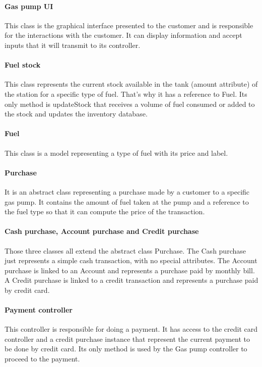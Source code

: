 \paragraph{Gas pump UI}
This class is the graphical interface presented to the customer and is responsible for the interactions with the customer. It can display information and accept inputs that it will transmit to its controller.

\paragraph{Fuel stock}
This class represents the current stock available in the tank (amount attribute) of the station for a specific type of fuel. That's why it has a reference to Fuel.
Its only method is updateStock that receives a volume of fuel consumed or added to the stock and updates the inventory database.

\paragraph{Fuel}
This class is a model representing a type of fuel with its price and label.

\paragraph{Purchase}
It is an abstract class representing a purchase made by a customer to a specific gas pump. It contains the amount of fuel taken at the pump and a reference to the fuel type so that it can compute the price of the transaction.

\paragraph{Cash purchase, Account purchase and Credit purchase}
Those three classes all extend the abstract class Purchase.
The Cash purchase just represents a simple cash transaction, with no special attributes.
The Account purchase is linked to an Account and represents a purchase paid by monthly bill. 
A Credit purchase is linked to a credit transaction and represents a purchase paid by credit card.

\paragraph{Payment controller}
This controller is responsible for doing a payment. It has access to the credit card controller and a credit purchase instance that represent the current payment to be done by credit card. Its only method is used by the Gas pump controller to proceed to the payment.

